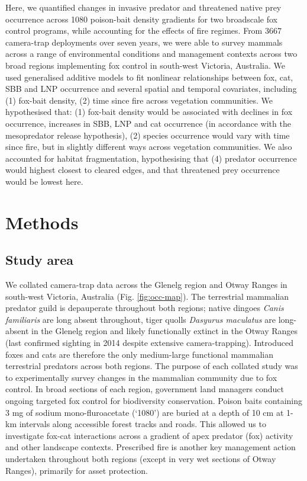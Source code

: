 \documentclass[11pt,a4paper,titlepage,twoside,openright]{style/unimelbthesis}
\begin{document}
\begin{mainmatter}
Here, we quantified changes in invasive predator and threatened native prey occurrence across 1080 poison-bait density gradients for two broadscale fox control programs, while accounting for the effects of fire regimes. From 3667 camera-trap deployments over seven years, we were able to survey mammals across a range of environmental conditions and management contexts across two broad regions implementing fox control in south-west Victoria, Australia. We used generalised additive models to fit nonlinear relationships between fox, cat, SBB and LNP occurrence and several spatial and temporal covariates, including (1) fox-bait density, (2) time since fire across vegetation communities. We hypothesised that: (1) fox-bait density would be associated with declines in fox occurrence, increases in SBB, LNP and cat occurrence (in accordance with the mesopredator release hypothesis), (2) species occurrence would vary with time since fire, but in slightly different ways across vegetation communities. We also accounted for habitat fragmentation, hypothesising that (4) predator occurrence would highest closest to cleared edges, and that threatened prey occurrence would be lowest here.

\newpage

\hypertarget{methods-1}{%
\section{Methods}\label{methods-1}}

\hypertarget{study-area-1}{%
\subsection{Study area}\label{study-area-1}}

We collated camera-trap data across the Glenelg region and Otway Ranges in south-west Victoria, Australia (Fig. \ref{fig:occ-map}). The terrestrial mammalian predator guild is depauperate throughout both regions; native dingoes \emph{Canis familiaris} are long absent throughout, tiger quolls \emph{Dasyurus maculatus} are long-absent in the Glenelg region and likely functionally extinct in the Otway Ranges (last confirmed sighting in 2014 despite extensive camera-trapping). Introduced foxes and cats are therefore the only medium-large functional mammalian terrestrial predators across both regions. The purpose of each collated study was to experimentally survey changes in the mammalian community due to fox control. In broad sections of each region, government land managers conduct ongoing targeted fox control for biodiversity conservation. Poison baits containing 3 mg of sodium mono-fluroacetate (`1080') are buried at a depth of 10 cm at 1-km intervals along accessible forest tracks and roads. This allowed us to investigate fox-cat interactions across a gradient of apex predator (fox) activity and other landscape contexts. Prescribed fire is another key management action undertaken throughout both regions (except in very wet sections of Otway Ranges), primarily for asset protection.


\end{mainmatter}
\end{document}
